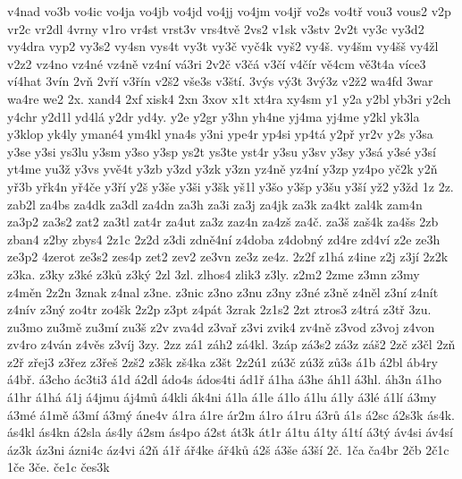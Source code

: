 {v4nad
vo3b
vo4ic
vo4ja
vo4jb
vo4jd
vo4jj
vo4jm
vo4j\v r
vo2s
vo4t\v r
vou3
vous2
v2p
vr2c
vr2dl
4vrny
v1ro
vr4st
vrst3v
vrs4tv\v e
2vs2
v1sk
v3stv
2v2t
vy3c
vy3d2
vy4dra
vyp2
vy3s2
vy4sn
vys4t
vy3t
vy3\v c
vy\v c4k
vy\v s2
vy4\v s.
vy4\v sm
vy4\v s\v s
vy4\v zl
v2z2
vz4no
vz4n\'e
vz4n\v e
vz4n\'i
v\'a3ri
2v2\v c
v3\v c\'a
v3\v c\'i
v4\v c\'ir
v\v e4cm
v\v e3t4a
v\'ice3
v\'i4hat
3v\'in
2v\v n
2v\v r\'i
v3\v r\'in
v2\v s2
v\v se3s
v3\v st\'i.
3v\'ys
v\'y3t
3v\'y3z
v2\v z2
wa4fd
3war
wa4re
we2
2x.
xand4
2xf
xisk4
2xn
3xov
x1t
xt4ra
xy4sm
y1
y2a
y2bl
yb3ri
y2ch
y4chr
y2d1l
yd4l\'a
y2dr
yd4y.
y2e
y2gr
y3hn
yh4ne
yj4ma
yj4me
y2kl
yk3la
y3klop
yk4ly
yman\'e4
ym4kl
yna4s
y3ni
ype4r
yp4si
yp4t\'a
y2p\v r
yr2v
y2s
y3sa
y3se
y3si
ys3lu
y3sm
y3so
y3sp
ys2t
ys3te
yst4r
y3su
y3sv
y3sy
y3s\'a
y3s\'e
y3s\'i
yt4me
yu3\v z
y3vs
yv\v e4t
y3zb
y3zd
y3zk
y3zn
yz4n\v e
yz4n\'i
y3zp
yz4po
y\v c2k
y2\v n
y\v r3b
y\v rk4n
y\v r4\v ce
y3\v r\'i
y2\v s
y3\v se
y3\v si
y3\v sk
y\v s1l
y3\v so
y3\v sp
y3\v su
y3\v s\'i
y\v z2
y3\v zd
1z
2z.
zab2l
za4bs
za4dk
za3dl
za4dn
za3h
za3i
za3j
za4jk
za3k
za4kt
zal4k
zam4n
za3p2
za3s2
zat2
za3tl
zat4r
za4ut
za3z
zaz4n
za4z\v s
za4\v c.
za3\v s
za\v s4k
za4\v ss
2zb
zban4
z2by
zbys4
2z1c
2z2d
z3di
zdn\v e4n\'i
z4doba
z4dobn\'y
zd4re
zd4v\'i
z2e
ze3h
ze3p2
4zerot
ze3s2
zes4p
zet2
zev2
ze3vn
ze3z
ze4z.
2z2f
z1h\'a
z4ine
z2j
z3j\'i
2z2k
z3ka.
z3ky
z3k\'e
z3k\r u
z3k\'y
2zl
3zl.
zlhos4
zlik3
z3ly.
z2m2
2zme
z3mn
z3my
z4m\v en
2z2n
3znak
z4nal
z3ne.
z3nic
z3no
z3nu
z3ny
z3n\'e
z3n\v e
z4n\v el
z3n\'i
z4n\'it
z4n\'iv
z3n\'y
zo4tr
zo4\v sk
2z2p
z3pt
z4p\'at
3zrak
2z1s2
2zt
ztros3
z4tr\'a
z3t\v r
3zu.
zu3mo
zu3m\v e
zu3m\'i
zu3\v s
z2v
zva4d
z3va\v r
z3vi
zvik4
zv4n\v e
z3vod
z3voj
z4von
zv4ro
z4v\'an
z4v\v es
z3v\'ij
3zy.
2zz
z\'a1
z\'ah2
z\'a4kl.
3z\'ap
z\'a3s2
z\'a3z
z\'a\v s2
2z\v c
z3\v cl
2z\v n
z2\v r
z\v rej3
z3\v rez
z3\v re\v s
2z\v s2
z3\v sk
z\v s4ka
z3\v st
2z2\'u1
z\'u3\v c
z\'u3\v z
z\r u3s
\'a1b
\'a2bl
\'ab4ry
\'a4b\v r.
\'a3cho
\'ac3ti3
\'a1d
\'a2dl
\'ado4s
\'ados4ti
\'ad1\v r
\'a1ha
\'a3he
\'ah1l
\'a3hl.
\'ah3n
\'a1ho
\'a1hr
\'a1h\'a
\'a1j
\'a4jmu
\'aj4m\r u
\'a4kli
\'ak4ni
\'a1la
\'a1le
\'a1lo
\'a1lu
\'a1ly
\'a3l\'e
\'a1l\'i
\'a3my
\'a3m\'e
\'a1m\v e
\'a3m\'i
\'a3m\'y
\'ane4v
\'a1ra
\'a1re
\'ar2m
\'a1ro
\'a1ru
\'a3r\r u
\'a1s
\'a2sc
\'a2s3k
\'as4k.
\'as4kl
\'as4kn
\'a2sla
\'as4ly
\'a2sm
\'as4po
\'a2st
\'at3k
\'at1r
\'a1tu
\'a1ty
\'a1t\'i
\'a3t\'y
\'av4si
\'av4s\'i
\'az3k
\'az3ni
\'azni4c
\'az4vi
\'a2\v n
\'a1\v r
\'a\v r4ke
\'a\v r4k\r u
\'a2\v s
\'a3\v se
\'a3\v s\'i
2\v c.
1\v ca
\v ca4br
2\v cb
2\v c1c
1\v ce
3\v ce.
\v ce1c
\v ces3k
}
